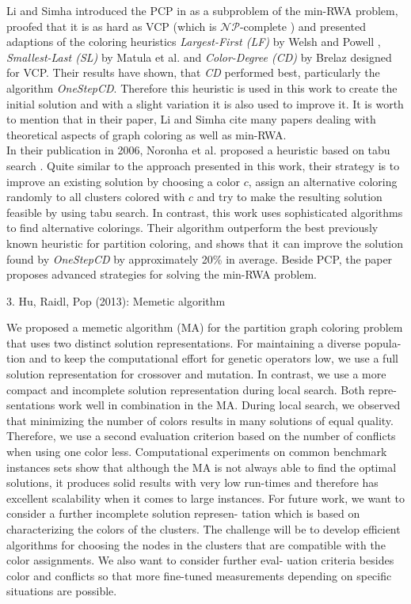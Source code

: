 Li and Simha introduced the PCP in \cite{li-00} as a subproblem of the min-RWA problem, proofed that it is as hard as VCP (which is $\mathcal{NP}$-complete \cite{karp-72}) and presented adaptions of the coloring heuristics \textit{Largest-First (LF)} by Welsh and Powell \cite{welsh-67}, \textit{Smallest-Last (SL)} by Matula et al. \cite{matula-72} and \textit{Color-Degree (CD)} by Brelaz \cite{brelaz-79} designed for VCP. Their results have shown, that \textit{CD} performed best, particularly the algorithm \textit{OneStepCD}. Therefore this heuristic is used in this work to create the initial solution and with a slight variation it is also used to improve it. It is worth to mention that in their paper, Li and Simha cite many papers dealing with theoretical aspects of graph coloring as well as min-RWA.\\

In their publication in 2006, Noronha et al. proposed a heuristic based on tabu search \cite{noronha-06}. Quite similar to the approach presented in this work, their strategy is to improve an existing solution by choosing a color $c$, assign an alternative coloring randomly to all clusters colored with $c$ and try to make the resulting solution feasible by using tabu search. In contrast, this work uses sophisticated algorithms to find alternative colorings. Their algorithm outperform the best previously known heuristic for partition coloring, and shows that it can improve the solution found by \textit{OneStepCD} by approximately 20\% in average. Beside PCP, the paper proposes advanced strategies for solving the min-RWA problem.

3. Hu, Raidl, Pop (2013): Memetic algorithm

We proposed a memetic algorithm (MA) for the partition graph coloring problem
that uses two distinct solution representations. For maintaining a diverse popula-
tion and to keep the computational effort for genetic operators low, we use a full
solution representation for crossover and mutation. In contrast, we use a more
compact and incomplete solution representation during local search. Both repre-
sentations work well in combination in the MA. During local search, we observed
that minimizing the number of colors results in many solutions of equal quality.
Therefore, we use a second evaluation criterion based on the number of conflicts
when using one color less. Computational experiments on common benchmark
instances sets show that although the MA is not always able to find the optimal
solutions, it produces solid results with very low run-times and therefore has
excellent scalability when it comes to large instances.
For future work, we want to consider a further incomplete solution represen-
tation which is based on characterizing the colors of the clusters. The challenge
will be to develop efficient algorithms for choosing the nodes in the clusters that
are compatible with the color assignments. We also want to consider further eval-
uation criteria besides color and conflicts so that more fine-tuned measurements
depending on specific situations are possible.